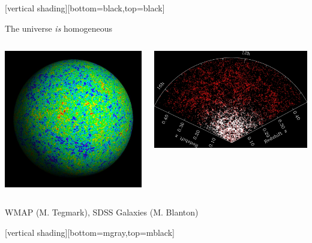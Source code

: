 \documentclass{beamer}
\begin{document}
{
    [vertical shading][bottom=black,top=black]


    \frame
    {
        The universe {\em is} homogeneous
        \begin{columns}[T]
            \begin{column}{0.55\textwidth}
                \includegraphics[trim=50 50 50 50,clip,width=\textwidth]{CMB-Tegmark.jpeg}
            \end{column}
            \begin{column}{0.55\textwidth}
                \vspace{10 mm}
                \includegraphics[width=\textwidth]{sdss-gals-blanton.jpg}
            \end{column}
        \end{columns}
        {\tiny \hfill WMAP (M. Tegmark), SDSS Galaxies (M. Blanton)}
    }
    [vertical shading][bottom=mgray,top=mblack]

}
\end{document}
